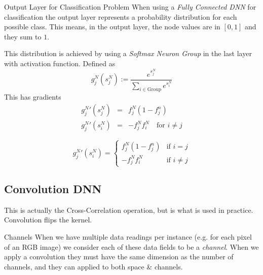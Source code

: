 \documentclass[11pt,a4paper]{article}
\begin{document}
  \begin{proposition}{Output Layer for Classification Problem}
    When using a \textit{Fully Connected DNN} for classification the output layer represents a probability distribution for each possible class. This means, in the output layer, the node values are in $[0,1]$ and they sum to $1$.
    \par This distribution is achieved by using a \textit{Softmax Neuron Group} in the last layer with activation function. Defined as
    \[  g_j^N(s_j^N):=\frac{e^{s_j^N}}{\displaystyle\sum_{i\in\text{Group}}e^{s_i^N}} \]
    This has gradients
    \[\begin{array}{rcl}
      {g_j^N}'(s_j^N)&=&f_j^N(1-f_j^n)\\
      {g_j^N}'(s_{i}^N)&=&-f_j^Nf_i^N\quad\text{for }i\neq j
    \end{array}\]

    \[ {g_j^N}'(s_i^N)=\begin{cases}f_j^N(1-f_j^n)&\text{if }i=j\\-f_j^Nf_i^N&\text{if }i\neq j\end{cases} \]
  \end{proposition}

\subsection{Convolution DNN} \label{sec_CNN}

  \begin{remark}{This is actually the Cross-Correlation operation, but is what is used in practice.}
    Convolution flips the kernel.
  \end{remark}

  \begin{definition}{Channels}
    When we have multiple data readings per instance (e.g. for each pixel of an RGB image) we consider each of these data fields to be a \textit{channel}. When we apply a convolution they must have the same dimension as the number of channels, and they can applied to both space \& channels.
  \end{definition}
\end{document}
